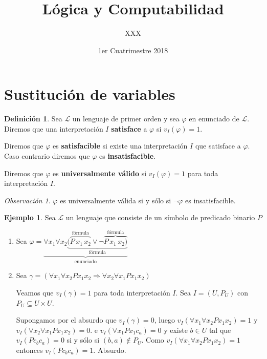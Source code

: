 \documentclass[a4paper,11pt]{article}
\title{Lógica y Computabilidad}
\author{XXX}
\date{1er Cuatrimestre 2018}
\theoremstyle{definition}
\newtheorem{defn}{Definición}[section]
\newtheorem{exap}{Ejemplo}[section]
\theoremstyle{remark}
\newtheorem*{remk}{Observación}
\def\LL{\ensuremath{\mathcal{L}}}
\begin{document}
\maketitle

\section{Sustitución de variables}

\begin{defn}
    Sea $\LL$ un lenguaje de primer orden y sea $\varphi$ en enunciado de $\LL$. 
    Diremos que una interpretación $I$ \textbf{satisface} a $\varphi$
    si $v_I(\varphi) = 1$.

    Diremos que $\varphi$ es \textbf{satisfacible} si existe una
    interpretación $I$ que satisface a $\varphi$. Caso contrario diremos
    que $\varphi$ es \textbf{insatisfacible}.

    Diremos que $\varphi$ es \textbf{universalmente válido} si
    $v_I(\varphi) = 1$ para toda interpretación $I$.
\end{defn}

\begin{remk}
    $\varphi$ es universalmente válida si y sólo si $\lnot \varphi$
    es insatisfacible.
\end{remk}

\begin{exap}
    Sea $\LL$ un lenguaje que consiste de un símbolo de predicado
    binario $P$

    \begin{enumerate}
        \item Sea $\varphi = \underbrace{\forall x_1 \forall x_2 
        \underbrace{(\overbrace{P\,x_1\,x_2}^{\text{fórmula}} \lor 
        \lnot \overbrace{P\, x_1\,x_2)}^{\text{fórmula}}}_{\text{fórmula}}}_{\text{enunciado}}$

        \item Sea $\gamma = (\forall x_1 \forall x_2 P x_1 x_2
        \Rightarrow \forall x_2 \forall x_1 P x_1 x_2)$

        Veamos que $v_I(\gamma) = 1$ para toda interpretación $I$. 
        Sea $I = (U, P_U)$ con $P_U \subseteq U\times U$.

        Supongamos por el absurdo que $v_I(\gamma) = 0$, luego
        $v_I(\forall x_1 \forall x_2 P x_1 x_2) = 1$ y 
        $v_I(\forall x_2 \forall x_1 P x_1 x_2) = 0$.
        e $v_I(\forall x_1 P x_1 c_a) = 0$
        y existe $b \in U$ tal que $v_I(P c_b c_a) = 0$ si y sólo si
        $(b, a) \not\in P_U$. Como $v_I(\forall x_1 \forall x_2 P x_1 x_2) = 1$
        entonces $v_I(P c_b c_a) = 1$. Absurdo.
    \end{enumerate}
\end{exap}
\end{document}
